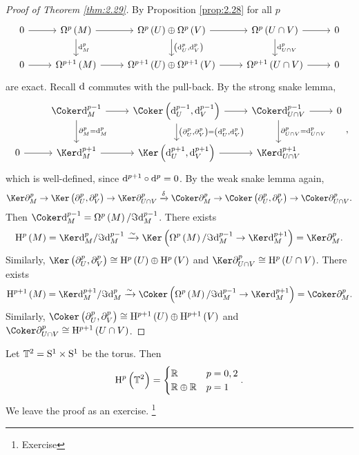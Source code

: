 \pagebreak

\begin{proof}[Proof of Theorem \ref{thm:2.29}]
By Proposition \ref{prop:2.28} for all $ p $
$$
\begin{tikzcd}
0 \arrow{r} & \Omega^p\br{M} \arrow{r} \arrow{d}{\d_M^p} & \Omega^p\br{U} \oplus \Omega^p\br{V} \arrow{r} \arrow{d}{\br{\d_U^p, \d_V^p}} & \Omega^p\br{U \cap V} \arrow{r} \arrow{d}{\d_{U \cap V}^p} & 0 \\
0 \arrow{r} & \Omega^{p + 1}\br{M} \arrow{r} & \Omega^{p + 1}\br{U} \oplus \Omega^{p + 1}\br{V} \arrow{r} & \Omega^{p + 1}\br{U \cap V} \arrow{r} & 0
\end{tikzcd}
$$
are exact. Recall $ \mathrm{d} $ commutes with the pull-back. By the strong snake lemma,
$$
\begin{tikzcd}
& \Coker \d_M^{p - 1} \arrow{r} \arrow{d}{\partial_M^p = \d_M^p} & \Coker \br{\d_U^{p - 1}, \d_V^{p - 1}} \arrow{r} \arrow{d}{\br{\partial_U^p, \partial_V^p} = \br{\d_U^p, \d_V^p}} & \Coker \d_{U \cap V}^{p - 1} \arrow{r} \arrow{d}{\partial_{U \cap V}^p = \d_{U \cap V}^p} & 0 \\
0 \arrow{r} & \Ker \d_M^{p + 1} \arrow{r} & \Ker \br{\d_U^{p + 1}, \d_V^{p + 1}} \arrow{r} & \Ker \d_{U \cap V}^{p + 1} &
\end{tikzcd},
$$
which is well-defined, since $ \mathrm{d}^{p + 1} \circ \mathrm{d}^p = 0 $. By the weak snake lemma again,
$$ \Ker \partial_M^p \to \Ker \br{\partial_U^p, \partial_V^p} \to \Ker \partial_{U \cap V}^p \xrightarrow{\delta} \Coker \partial_M^p \to \Coker \br{\partial_U^p, \partial_V^p} \to \Coker \partial_{U \cap V}^p. $$
Then $ \Coker \d_M^{p - 1} = \Omega^p\br{M} / \Im \d_M^{p - 1} $. There exists
$$ \H^p\br{M} = \Ker \d_M^p / \Im \d_M^{p - 1} \xrightarrow{\sim} \Ker \br{\Omega^p\br{M} / \Im \d_M^{p - 1} \to \Ker \d_M^{p + 1}} = \Ker \partial_M^p. $$
Similarly, $ \Ker \br{\partial_U^p, \partial_V^p} \cong \H^p\br{U} \oplus \H^p\br{V} $ and $ \Ker \partial_{U \cap V}^p \cong \H^p\br{U \cap V} $. There exists
$$ \H^{p + 1}\br{M} = \Ker \d_M^{p + 1} / \Im \d_M^p \xrightarrow{\sim} \Coker \br{\Omega^p\br{M} / \Im \d_M^{p - 1} \to \Ker \d_M^{p + 1}} = \Coker \partial_M^p. $$
Similarly, $ \Coker \br{\partial_U^p, \partial_V^p} \cong \H^{p + 1}\br{U} \oplus \H^{p + 1}\br{V} $ and $ \Coker \partial_{U \cap V}^p \cong \H^{p + 1}\br{U \cap V} $.
\end{proof}


\begin{example}
Let $ \mathbb{T}^2 = \mathrm{S}^1 \times \mathrm{S}^1 $ be the torus. Then
$$ \H^p\br{\TT^2} =
\begin{cases}
\RR & p = 0, 2 \\
\RR \oplus \RR & p = 1
\end{cases}.
$$
We leave the proof as an exercise. \footnote{Exercise}
\end{example}

